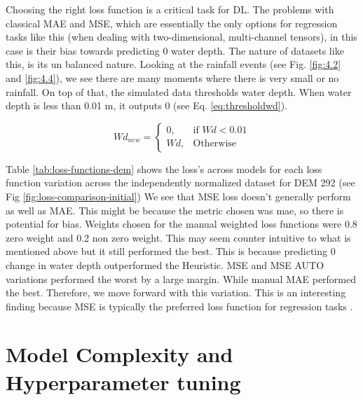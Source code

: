 Choosing the right loss function is a critical task for DL. The problems with classical MAE and MSE, which are essentially the only options for regression tasks like this (when dealing with two-dimensional, multi-channel tensors), in this case is their bias towards predicting 0 water depth. The nature of datasets like this, is its un balanced nature. Looking at the rainfall events (see Fig. \ref{fig:4.2} and \ref{fig:4.4}), we see there are many moments where there is very small or no rainfall. On top of that, the simulated data thresholds water depth. When water depth is less than 0.01 m, it outputs 0 (see Eq. \ref{eq:thresholdwd}).

\begin{equation}
	\label{eq:thresholdwd}
	Wd_{new} = \begin{cases}
		0, & \text{if } Wd < 0.01 \\
		Wd, & \text{Otherwise}
	\end{cases}
\end{equation}

Table \ref{tab:loss-functions-dem} shows the loss's across models for each loss function variation across the independently normalized dataset for DEM 292 (see Fig \ref{fig:loss-comparison-initial}) We see that MSE loss doesn't generally perform as well as MAE. This might be because the metric chosen was mae, so there is potential for bias. Weights chosen for the  manual weighted loss functions were 0.8 zero weight and 0.2 non zero weight. This may seem counter intuitive to what is mentioned above but it still performed the best. This is because predicting 0 change in water depth outperformed the Heuristic. MSE and MSE AUTO variations performed the worst by a large margin. While manual MAE performed the best. Therefore, we move forward with this variation. This is an interesting finding because MSE is typically the preferred loss function for regression tasks \cite{jadon2022comprehensive}.  

\section{Model Complexity and Hyperparameter tuning}

